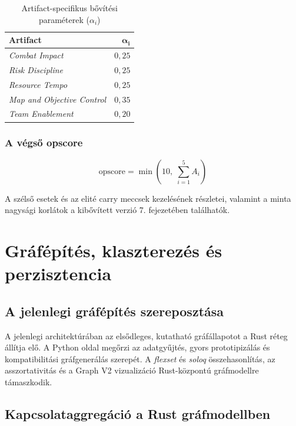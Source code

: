 \begin{table}[H]
\centering
\caption{Artifact-specifikus bővítési paraméterek ($\alpha_i$)}
\label{tab:overflow_params}
\begin{tabular}{lr}
\toprule
\textbf{Artifact} & $\boldsymbol{\alpha_i}$ \\
\midrule
\textit{Combat Impact}             & $0{,}25$ \\
\textit{Risk Discipline}           & $0{,}25$ \\
\textit{Resource Tempo}            & $0{,}25$ \\
\textit{Map and Objective Control} & $0{,}35$ \\
\textit{Team Enablement}           & $0{,}20$ \\
\bottomrule
\end{tabular}
\end{table}

\subsection{A végső opscore}

\begin{equation}
\text{opscore} = \min\!\left(10,\; \sum_{i=1}^{5} A_i\right)
\end{equation}

A szélső esetek és az elité carry meccsek kezelésének részletei, valamint a minta nagysági korlátok a kibővített verzió 7. fejezetében találhatók.

\chapter{Gráfépítés, klaszterezés és perzisztencia}

\section{A jelenlegi gráfépítés szereposztása}

A jelenlegi architektúrában az elsődleges, kutatható gráfállapotot a Rust réteg állítja elő. A Python oldal megőrzi az adatgyűjtés, gyors prototipizálás és kompatibilitási gráfgenerálás szerepét. A \textit{flexset} és \textit{soloq} összehasonlítás, az asszortativitás és a Graph V2 vizualizáció Rust-központú gráfmodellre támaszkodik.

\section{Kapcsolataggregáció a Rust gráfmodellben}

